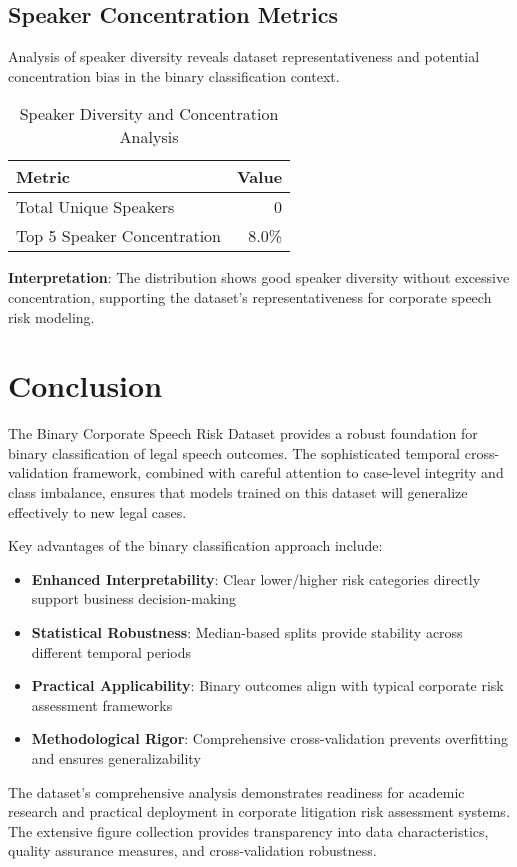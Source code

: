 \documentclass[11pt,a4paper]{article}
\begin{document}
\subsection{Speaker Concentration Metrics}

Analysis of speaker diversity reveals dataset representativeness and potential concentration bias in the binary classification context.

\begin{table}[H]
\centering
\caption{Speaker Diversity and Concentration Analysis}
\begin{tabular}{lr}
\toprule
\textbf{Metric} & \textbf{Value} \\
\midrule
Total Unique Speakers & 0 \\
Top 5 Speaker Concentration & 8.0\% \\
\bottomrule
\end{tabular}
\end{table}

\textbf{Interpretation}: The distribution shows good speaker diversity without excessive concentration, supporting the dataset's representativeness for corporate speech risk modeling.

\section{Conclusion}

The Binary Corporate Speech Risk Dataset provides a robust foundation for binary classification of legal speech outcomes. The sophisticated temporal cross-validation framework, combined with careful attention to case-level integrity and class imbalance, ensures that models trained on this dataset will generalize effectively to new legal cases.

Key advantages of the binary classification approach include:

\begin{itemize}
\item \textbf{Enhanced Interpretability}: Clear lower/higher risk categories directly support business decision-making
\item \textbf{Statistical Robustness}: Median-based splits provide stability across different temporal periods
\item \textbf{Practical Applicability}: Binary outcomes align with typical corporate risk assessment frameworks
\item \textbf{Methodological Rigor}: Comprehensive cross-validation prevents overfitting and ensures generalizability
\end{itemize}

The dataset's comprehensive analysis demonstrates readiness for academic research and practical deployment in corporate litigation risk assessment systems. The extensive figure collection provides transparency into data characteristics, quality assurance measures, and cross-validation robustness.
\end{document}
